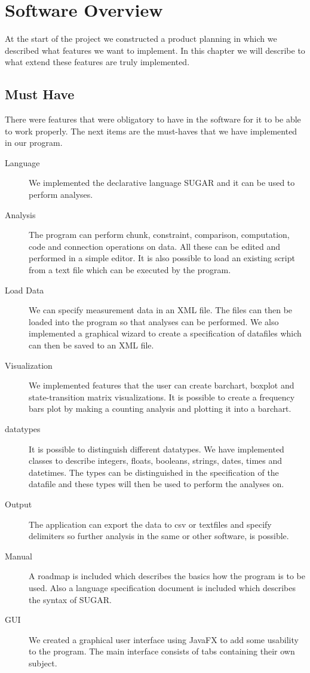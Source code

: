\chapter{Software Overview} %
At the start of the project we constructed a product planning in which we described what features we want to implement. In this chapter we will describe to what extend these features are truly implemented.

\section{Must Have}
There were features that were obligatory to have in the software for it to be able to work properly. The next items are the must-haves that we have implemented in our program.
\begin{description}

\item[Language] We implemented the declarative language SUGAR and it can be used to perform analyses. 

\item[Analysis] The program can perform chunk, constraint, comparison, computation, code and connection operations on data. All these can be edited and performed in a simple editor. It is also possible to load an existing script from a text file which can be executed by the program.

\item[Load Data] We can specify measurement data in an XML file. The files can then be loaded into the program so that analyses can be performed. We also implemented a graphical wizard to create a specification of datafiles which can then be saved to an XML file.

\item[Visualization] We implemented features that the user can create barchart, boxplot and state-transition matrix visualizations. It is possible to create a frequency bars plot by making a counting analysis and plotting it into a barchart.

\item[datatypes] It is possible to distinguish different datatypes. We have implemented classes to describe integers, floats, booleans, strings, dates, times and datetimes. The types can be distinguished in the specification of the datafile and these types will then be used to perform the analyses on.

\item[Output] The application can export the data to csv or textfiles and specify delimiters so further analysis in the same or other software, is possible.

\item[Manual] A roadmap is included which describes the basics how the program is to be used. Also a language specification document is included which describes the syntax of SUGAR.

\item[GUI] We created a graphical user interface using JavaFX to add some usability to the program. The main interface consists of tabs containing their own subject.

\end{description}


